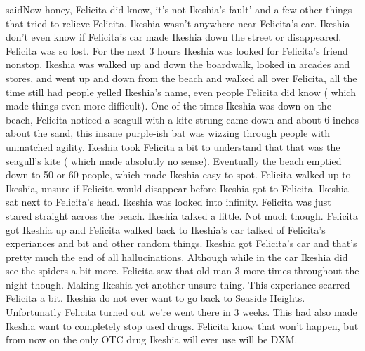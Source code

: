 \documentclass[12pt]{book}
\begin{document}
saidNow honey, Felicita did know, it's not Ikeshia's fault' and a few other things that tried to relieve Felicita. Ikeshia wasn't anywhere near Felicita's car. Ikeshia don't even know if Felicita's car made Ikeshia down the street or disappeared. Felicita was so lost. For the next 3 hours Ikeshia was looked for Felicita's friend nonstop. Ikeshia was walked up and down the boardwalk, looked in arcades and stores, and went up and down from the beach and walked all over Felicita, all the time still had people yelled Ikeshia's name, even people Felicita did know ( which made things even more difficult). One of the times Ikeshia was down on the beach, Felicita noticed a seagull with a kite strung came down and about 6 inches about the sand, this insane purple-ish bat was wizzing through people with unmatched agility. Ikeshia took Felicita a bit to understand that that was the seagull's kite ( which made absolutly no sense). Eventually the beach emptied down to 50 or 60 people, which made Ikeshia easy to spot. Felicita walked up to Ikeshia, unsure if Felicita would disappear before Ikeshia got to Felicita. Ikeshia sat next to Felicita's head. Ikeshia was looked into infinity. Felicita was just stared straight across the beach. Ikeshia talked a little. Not much though. Felicita got Ikeshia up and Felicita walked back to Ikeshia's car talked of Felicita's experiances and bit and other random things. Ikeshia got Felicita's car and that's pretty much the end of all hallucinations. Although while in the car Ikeshia did see the spiders a bit more. Felicita saw that old man 3 more times throughout the night though. Making Ikeshia yet another unsure thing. This experiance scarred Felicita a bit. Ikeshia do not ever want to go back to Seaside Heights. Unfortunatly Felicita turned out we're went there in 3 weeks. This had also made Ikeshia want to completely stop used drugs. Felicita know that won't happen, but from now on the only OTC drug Ikeshia will ever use will be DXM.
\end{document}
